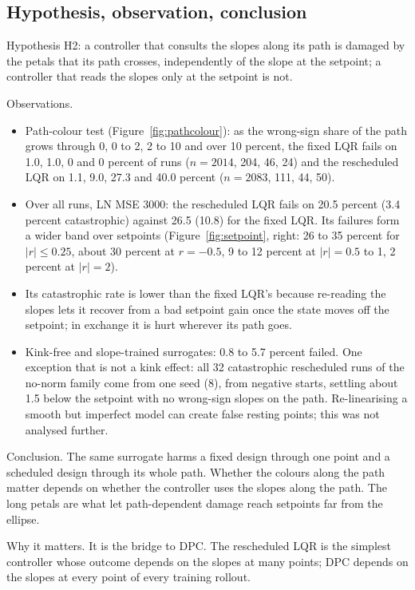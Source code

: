 \documentclass[11pt]{article}
\begin{document}
\subsection{Hypothesis, observation, conclusion}
Hypothesis H2: a controller that consults the slopes along its path is damaged by the petals that its path crosses, independently of the slope at the setpoint; a controller that reads the slopes only at the setpoint is not.

Observations.
\begin{itemize}
\item Path-colour test (Figure~\ref{fig:pathcolour}): as the wrong-sign share of the path grows through 0, 0 to 2, 2 to 10 and over 10 percent, the fixed LQR fails on 1.0, 1.0, 0 and 0 percent of runs ($n=2014$, 204, 46, 24) and the rescheduled LQR on 1.1, 9.0, 27.3 and 40.0 percent ($n=2083$, 111, 44, 50).
\item Over all runs, LN MSE 3000: the rescheduled LQR fails on 20.5 percent (3.4 percent catastrophic) against 26.5 (10.8) for the fixed LQR. Its failures form a wider band over setpoints (Figure~\ref{fig:setpoint}, right: 26 to 35 percent for $|r|\le0.25$, about 30 percent at $r=-0.5$, 9 to 12 percent at $|r|=0.5$ to 1, 2 percent at $|r|=2$).
\item Its catastrophic rate is lower than the fixed LQR's because re-reading the slopes lets it recover from a bad setpoint gain once the state moves off the setpoint; in exchange it is hurt wherever its path goes.
\item Kink-free and slope-trained surrogates: 0.8 to 5.7 percent failed. One exception that is not a kink effect: all 32 catastrophic rescheduled runs of the no-norm family come from one seed (8), from negative starts, settling about 1.5 below the setpoint with no wrong-sign slopes on the path. Re-linearising a smooth but imperfect model can create false resting points; this was not analysed further.
\end{itemize}
Conclusion. The same surrogate harms a fixed design through one point and a scheduled design through its whole path. Whether the colours along the path matter depends on whether the controller uses the slopes along the path. The long petals are what let path-dependent damage reach setpoints far from the ellipse.

Why it matters. It is the bridge to DPC. The rescheduled LQR is the simplest controller whose outcome depends on the slopes at many points; DPC depends on the slopes at every point of every training rollout.
\end{document}
